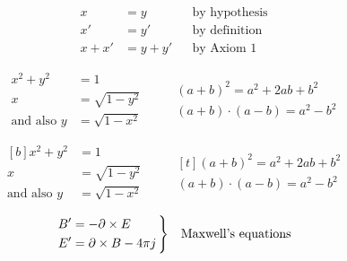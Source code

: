 \documentclass{article}
\begin{document}
\renewcommand\minalignsep{2em}
\begin{align}
 x     &= y     && \text{by hypothesis} \\
     x' &= y'    && \text{by definition} \\
  x + x' &= y + y' && \text{by Axiom 1}
\end{align}

\begin{equation}
\begin{aligned}
  x^2 + y^2  &= 1              \\
 x         &= \sqrt{1-y^2}   \\
 \text{and also }y &= \sqrt{1-x^2}
\end{aligned}              \qquad
\begin{gathered}
 (a + b)^2 = a^2 + 2ab + b^2    \\
 (a + b) \cdot (a - b) = a^2 - b^2
\end{gathered}     \end{equation}

\begin{equation}
\begin{aligned}[b]
  x^2 + y^2  &= 1              \\
 x         &= \sqrt{1-y^2}   \\
 \text{and also }y &= \sqrt{1-x^2}
\end{aligned}              \qquad
\begin{gathered}[t]
 (a + b)^2 = a^2 + 2ab + b^2    \\
 (a + b) \cdot (a - b) = a^2 - b^2
\end{gathered}
\end{equation}
\newenvironment{rcase}
   {\left.\begin{aligned}}
   {\end{aligned}\right\rbrace}

\begin{equation*}
  \begin{rcase}
    B' &= -\partial\times E         \\
    E' &=  \partial\times B - 4\pi j \,
  \end{rcase}
  \quad \text {Maxwell's equations}
\end{equation*}
\end{document}
